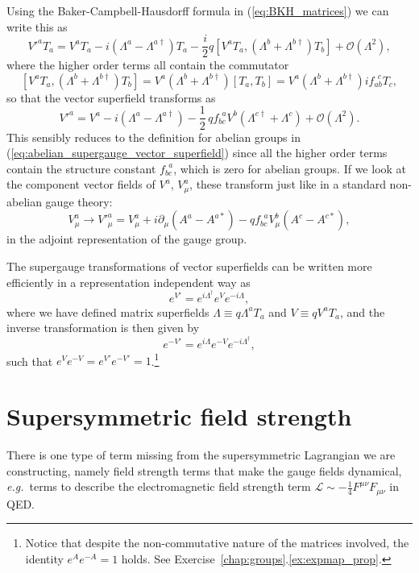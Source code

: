 \documentclass[notes.tex]{subfiles}
\begin{document}
Using the Baker-Campbell-Hausdorff formula in (\ref{eq:BKH_matrices}) we can write this as
\[V'^aT_a = V^aT_a - i(\Lambda^a-\Lambda^{a\dagger})T_a - \frac{i}{2}q[V^aT_a,(\Lambda^b + \Lambda^{b\dagger})T_b] +{\mathcal O}(\Lambda^2),\]
where the higher order terms all contain the commutator
\[ [V^aT_a,(\Lambda^b + \Lambda^{b\dagger})T_b] = V^a(\Lambda^b + \Lambda^{b\dagger}) [T_a,T_b]=  V^a(\Lambda^b + \Lambda^{b\dagger})if_{ab}^{~~c}T_c ,\]
so that the vector superfield transforms as 
\begin{equation}
V'^a = V^a - i(\Lambda^a-\Lambda^{a\dagger}) - \frac{1}{2}\,q f_{bc}^{~~a} V^b(\Lambda^{c\dagger} + \Lambda^c) +{\mathcal O}(\Lambda^2).
\label{eq:vector_superfield_nonabelian_supergauge_trans}
\end{equation}
This sensibly reduces to the definition for abelian groups in (\ref{eq:abelian_supergauge_vector_superfield}) since all the higher order terms contain the structure constant $f_{bc}^{~~a}$, which is zero for abelian groups. If we look at the component vector fields of $V^a$, $V^a_\mu$, these transform just like in a standard non-abelian  gauge theory:
\[V^a_\mu \to V'^a_\mu = V^a_\mu + i\partial_\mu(A^a - A^{a*}) - qf_{bc}^{~~a}V^b_\mu(A^c - A^{c*}),\]
in the adjoint representation of the gauge group.

The supergauge transformations of vector superfields can be written more efficiently in a representation independent way as
\[e^{V'} = e^{i\Lambda^\dagger}e^V e^{-i\Lambda},\]
where we have defined matrix superfields $\Lambda \equiv q \Lambda^aT_a$ and $V \equiv q V^aT_a$, and the inverse transformation is then given by
\[e^{-V'} = e^{i\Lambda}e^{-V} e^{-i\Lambda^\dagger},\]
such that $e^Ve^{-V} = e^{V'}e^{-V'} = 1$.\footnote{Notice that despite the non-commutative nature of the matrices involved, the identity $e^{A}e^{-A}=1$ holds. See Exercise~\ref{chap:groups}.\ref{ex:expmap_prop}.}



\section{Supersymmetric field strength}
\label{sec:fieldstrength}
There is one type of term missing from the supersymmetric Lagrangian we are constructing, namely field strength terms that make the gauge fields dynamical, {\it e.g.}\ terms to describe the electromagnetic field strength term $\mathcal{L}\sim-\frac{1}{4}F^{\mu\nu}F_{\mu\nu}$ in QED.
\end{document}
